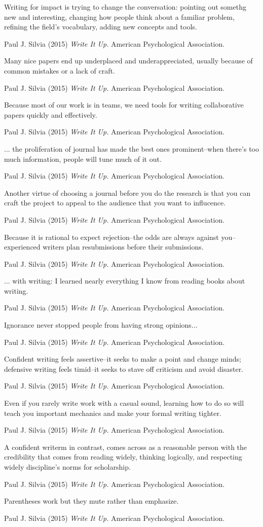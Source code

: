\epigraph{Writing for impact is trying to change the conversation: pointing out somethg new and interesting, changing how people think about a familiar problem, refining the field's vocabulary, adding new concepts and tools. }{Paul J. Silvia (2015) \emph{Write It Up.} American Psychological Association.}
\epigraph{Many nice papers end up underplaced and underappreciated, usually because of common mistakes or a lack of craft.}{Paul J. Silvia (2015) \emph{Write It Up.} American Psychological Association.}
\epigraph{Because most of our work is in teams, we need tools for writing collaborative papers quickly and effectively.}{Paul J. Silvia (2015) \emph{Write It Up.} American Psychological Association.}
\epigraph{... the proliferation of journal has made the best ones prominent--when there's too much information, people will tune much of it out.}{Paul J. Silvia (2015) \emph{Write It Up.} American Psychological Association.}
\epigraph{Another virtue of choosing a journal before you do the research is that you can craft the project to appeal to the audience that you want to influcence.}{Paul J. Silvia (2015) \emph{Write It Up.} American Psychological Association.}
\epigraph{Because it is rational to expect rejection--the odds are always against you--experienced writers plan resubmissions before their submissions.}{Paul J. Silvia (2015) \emph{Write It Up.} American Psychological Association.}
\epigraph{... with writing: I learned nearly everything I know from reading books about writing.}{Paul J. Silvia (2015) \emph{Write It Up.} American Psychological Association.}
\epigraph{Ignorance never stopped people from having strong opinions...}{Paul J. Silvia (2015) \emph{Write It Up.} American Psychological Association.}
\epigraph{Confident writing feels assertive--it seeks to make a point and change minds; defensive writing feels timid--it seeks to stave off criticism and avoid disaster.}{Paul J. Silvia (2015) \emph{Write It Up.} American Psychological Association.}
\epigraph{Even if you rarely write work with a casual sound, learning how to do so will teach you important mechanics and make your formal writing tighter.}{Paul J. Silvia (2015) \emph{Write It Up.} American Psychological Association.}
\epigraph{A confident writerm in contrast, comes across as a reasonable person with the credibility that comes from reading widely, thinking logically, and respecting widely discipline's norms for scholarship.}{Paul J. Silvia (2015) \emph{Write It Up.} American Psychological Association.}
\epigraph{Parentheses work but they mute rather than emphasize.}{Paul J. Silvia (2015) \emph{Write It Up.} American Psychological Association.}
